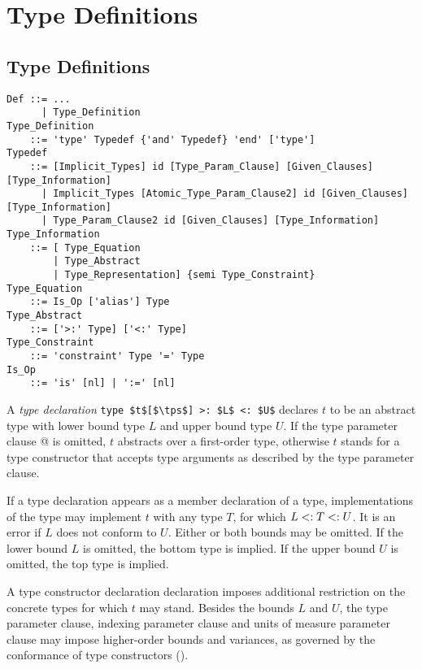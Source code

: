 
\chapter{Type Definitions}

\minitoc

\newpage

\section{Type Definitions}
\label{sec:type-decls-aliases}

\grammar\begin{lstlisting}
Def ::= ...
      | Type_Definition
Type_Definition 
    ::= 'type' Typedef {'and' Typedef} 'end' ['type']
Typedef 
    ::= [Implicit_Types] id [Type_Param_Clause] [Given_Clauses] [Type_Information]
      | Implicit_Types [Atomic_Type_Param_Clause2] id [Given_Clauses] [Type_Information]
      | Type_Param_Clause2 id [Given_Clauses] [Type_Information]
Type_Information
    ::= [ Type_Equation 
        | Type_Abstract 
        | Type_Representation] {semi Type_Constraint}
Type_Equation 
    ::= Is_Op ['alias'] Type
Type_Abstract 
    ::= ['>:' Type] ['<:' Type]
Type_Constraint 
    ::= 'constraint' Type '=' Type
Is_Op
    ::= 'is' [nl] | ':=' [nl]
\end{lstlisting}

A {\em type declaration} \lstinline!type $t$[$\tps$] >: $L$ <: $U$! declares $t$ to be an abstract type with lower bound type $L$ and upper bound type $U$. If the type parameter clause \lstinline@[$\tps$]@ is omitted, $t$ abstracts over a first-order type, otherwise $t$ stands for a type constructor that accepts type arguments as described by the type parameter clause. 

If a type declaration appears as a member declaration of a type, implementations of the type may implement $t$ with any type $T$, for which $L <: T <: U$. It is an error if $L$ does not conform to $U$. Either or both bounds may be omitted. If the lower bound $L$ is omitted, the bottom type  is implied. If the upper bound $U$ is omitted, the top type  is implied. 

A type constructor declaration declaration imposes additional restriction on the concrete types for which $t$ may stand. Besides the bounds $L$ and $U$, the type parameter clause, indexing parameter clause and units of measure parameter clause may impose higher-order bounds and variances, as governed by the conformance of type constructors ().

